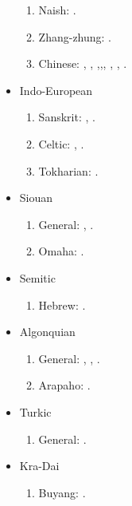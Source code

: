 \documentclass[oneside,a4paper,11pt]{article}
\newcommand{\langue}[2]{#1}
\begin{document}
\begin{itemize}
\begin{enumerate}
\item Naish: \cite{jacques.michaud11naish}.
\item  Zhang-zhung: \cite{jacques09zz}.
\item \langue{Chinese}{Chinois}:  \cite{jacques00ywij},  \cite{jacques03dissimilation},   \cite{jacques14honey},\cite{jacques15sr},\cite{jacques17genetic}, \cite{jacques17traditional}, \cite{jacques17buyang}, \cite{jacques16ssuffixes}.
\end{enumerate}
\item \langue{Indo-European}{Indo-européen}
\begin{enumerate}
\item Sanskrit: \cite{jacques13vama}, \cite{jacques16camara}.
\item \langue{Celtic}{Celtique}: \cite{michaud-jacques12nasalite}, \cite{jacques15cochon}.
\item \langue{Tokharian}{Tocharien}: \cite{jacques14honey}.
\end{enumerate}
\item \langue{Siouan}{Sioux}
\begin{enumerate}
\item \langue{General}{Général}: \cite{jacques12bear},      \cite{michaud-jacques12nasalite}.  
\item Omaha: \cite{jacques16ebde}.
\end{enumerate}
\item \langue{Semitic}{Sémitique}
\begin{enumerate}
\item \langue{Hebrew}{Hébreu}: \cite{rg-gj12yod}.
\end{enumerate}
\item \langue{Algonquian}{Algonquien}
\begin{enumerate}
\item \langue{General}{Général}: \cite{jacques12bear}, \cite{jacques14inverse}, \cite{jacques17directionality}.
\item Arapaho: \cite{jacques13arapaho}.
\end{enumerate}
\item  \langue{Turkic}{Turcique}
\begin{enumerate}
\item  \langue{General}{Général}: \cite{antonov12kumush}.
\end{enumerate}
\item Kra-Dai
\begin{enumerate}
\item Buyang: \cite{jacques17buyang}.
\end{enumerate}
\end{itemize} 
 
\end{document}
